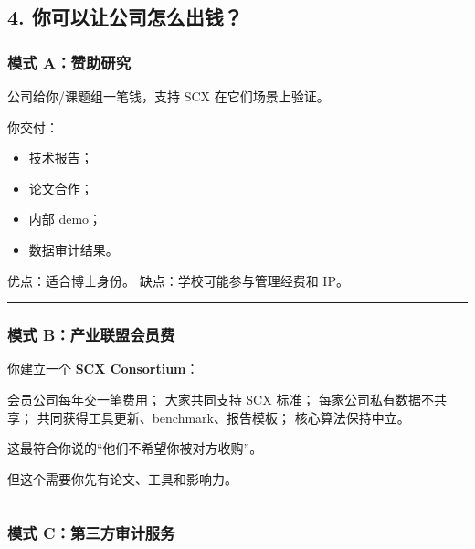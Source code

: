 \documentclass[
  12pt,
]{ctexart}
\newenvironment{Shaded}{}{}
\newcommand{\NormalTok}[1]{#1}
\providecommand{\tightlist}{%
  \setlength{\itemsep}{0pt}\setlength{\parskip}{0pt}}
\begin{document}
\subsection{4.
你可以让公司怎么出钱？}\label{ux4f60ux53efux4ee5ux8ba9ux516cux53f8ux600eux4e48ux51faux94b1}

\subsubsection{模式
A：赞助研究}\label{ux6a21ux5f0f-aux8d5eux52a9ux7814ux7a76}

公司给你/课题组一笔钱，支持 SCX 在它们场景上验证。

你交付：

\begin{itemize}
\tightlist
\item
  技术报告；
\item
  论文合作；
\item
  内部 demo；
\item
  数据审计结果。
\end{itemize}

优点：适合博士身份。 缺点：学校可能参与管理经费和 IP。

\begin{center}\rule{0.5\linewidth}{0.5pt}\end{center}

\subsubsection{模式
B：产业联盟会员费}\label{ux6a21ux5f0f-bux4ea7ux4e1aux8054ux76dfux4f1aux5458ux8d39}

你建立一个 \textbf{SCX Consortium}：

\begin{Shaded}
\begin{Highlighting}[]
\NormalTok{会员公司每年交一笔费用；}
\NormalTok{大家共同支持 SCX 标准；}
\NormalTok{每家公司私有数据不共享；}
\NormalTok{共同获得工具更新、benchmark、报告模板；}
\NormalTok{核心算法保持中立。}
\end{Highlighting}
\end{Shaded}

这最符合你说的``他们不希望你被对方收购''。

但这个需要你先有论文、工具和影响力。

\begin{center}\rule{0.5\linewidth}{0.5pt}\end{center}

\subsubsection{模式
C：第三方审计服务}\label{ux6a21ux5f0f-cux7b2cux4e09ux65b9ux5ba1ux8ba1ux670dux52a1}
\end{document}

